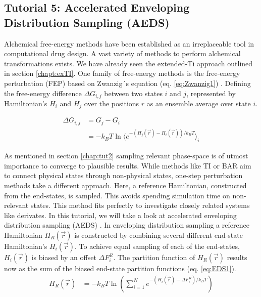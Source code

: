 
\subsection{Tutorial 5: Accelerated Enveloping Distribution Sampling (AEDS)}

Alchemical free-energy methods have been established as an irreplaceable tool in computational drug design. A vast variety of methods to perform alchemical transformations exists. We have already seen the extended-Ti approach outlined in section \ref{chapt:exTI}. One family of free-energy methods is the free-energy perturbation (FEP) based on Zwanzig´s equation (eq. \ref{eq:Zwanzig1}) \cite{Zwanzig1954}. Defining the free-energy difference $\Delta G_{i,j}$ between two states $i$ and $j$, represented by Hamiltonian's $H_i$ and $H_j$ over the positions $r$ as an ensemble average over state $i$. 

\begin{equation}
\begin{aligned}
\Delta G_{i,j} & = G_j - G_i \\ & = -k_BT \ln  \Biggl \langle e^{ -(H_j(\vec{r}) - H_i(\vec{r}))/k_BT} \biggr \rangle_i 
\end{aligned}
\label{eq:Zwanzig1}
\end{equation}

As mentioned in section \ref{chap:tut2} sampling relevant phase-space is of utmost importance to converge to plausible results. While methods like TI \cite{kirkwood_TI} or BAR \cite{bar} aim to connect physical states through non-physical states, one-step perturbation methods take a different approach. Here, a reference Hamiltonian, constructed from the end-states, is sampled. This avoids spending simulation time on non-relevant states. This method fits perfectly to investigate closely related systems like derivates. In this tutorial, we will take a look at accelerated enveloping distribution sampling (AEDS) \cite{JP2018,JP2020}. In enveloping distribution sampling a reference Hamiltonian $H_R(\vec{r})$ is constructed by combining several different end-state Hamiltonian's $H_i(\vec{r})$. To achieve equal sampling of each of the end-states, $H_i(\vec{r})$ is biased by an offset $\Delta F_{i}^R$. The partition function of $H_R(\vec{r})$ results now as the sum of the biased end-state partition functions (eq. \ref{eq:EDS1}).
\begin{equation}
\begin{aligned}
H_R(\vec{r}) & = -k_BT \ln  \left( \sum_{i=1}^{N} e^{ -(H_i(\vec{r}) - \Delta F_{i}^R)/k_BT} \right) 
\end{aligned}
\label{eq:EDS1}
\end{equation}

